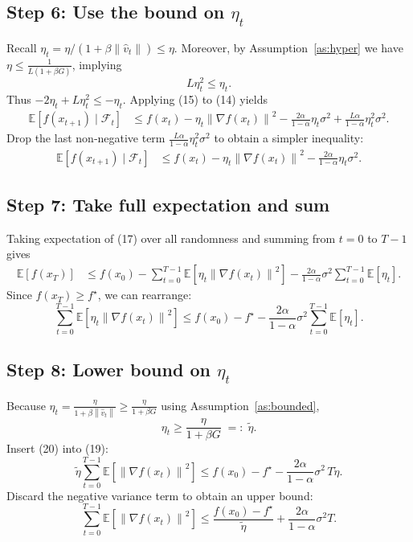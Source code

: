 \documentclass{article}
\newcommand{\E}{\mathbb{E}}
\newcommand{\norm}[1]{\left\|#1\right\|}
\newcommand{\grad}{\nabla}
\begin{document}
\subsection*{Step 6: Use the bound on $\eta_{t}$}
Recall $\eta_{t}= \eta/(1+\beta\norm{\hat v_{t}})\le \eta$. Moreover, by Assumption~\ref{as:hyper} we have $\eta\le \frac{1}{L(1+\beta G)}$, implying
\[
L\eta_{t}^{2}\le \eta_{t}. \tag{15}
\]
Thus $-2\eta_{t}+L\eta_{t}^{2}\le -\eta_{t}$. Applying (15) to (14) yields
\begin{align}
\E\!\left[f(x_{t+1})\mid\mathcal{F}_{t}\right]
&\le f(x_{t})
   -\eta_{t}\norm{\grad f(x_{t})}^{2}
   -\frac{2\alpha}{1-\alpha}\eta_{t}\sigma^{2}
   +\frac{L\alpha}{1-\alpha}\eta_{t}^{2}\sigma^{2}. \tag{16}
\end{align}
Drop the last non‑negative term $\frac{L\alpha}{1-\alpha}\eta_{t}^{2}\sigma^{2}$ to obtain a simpler inequality:
\begin{align}
\E\!\left[f(x_{t+1})\mid\mathcal{F}_{t}\right]
&\le f(x_{t}) -\eta_{t}\norm{\grad f(x_{t})}^{2}
   -\frac{2\alpha}{1-\alpha}\eta_{t}\sigma^{2}. \tag{17}
\end{align}

\subsection*{Step 7: Take full expectation and sum}
Taking expectation of (17) over all randomness and summing from $t=0$ to $T-1$ gives
\begin{align}
\E\!\left[f(x_{T})\right]
&\le f(x_{0})
   -\sum_{t=0}^{T-1}\E\!\left[\eta_{t}\norm{\grad f(x_{t})}^{2}\right]
   -\frac{2\alpha}{1-\alpha}\sigma^{2}\sum_{t=0}^{T-1}\E[\eta_{t}]. \tag{18}
\end{align}
Since $f(x_{T})\ge f^{\star}$, we can rearrange:
\[
\sum_{t=0}^{T-1}\E\!\left[\eta_{t}\norm{\grad f(x_{t})}^{2}\right]
\le f(x_{0})-f^{\star}
   -\frac{2\alpha}{1-\alpha}\sigma^{2}\sum_{t=0}^{T-1}\E[\eta_{t}]. \tag{19}
\]

\subsection*{Step 8: Lower bound on $\eta_{t}$}
Because $\eta_{t}= \displaystyle\frac{\eta}{1+\beta\norm{\hat v_{t}}}\ge \frac{\eta}{1+\beta G}$ using Assumption~\ref{as:bounded},
\[
\eta_{t}\ge \frac{\eta}{1+\beta G}\;=: \;\tilde\eta . \tag{20}
\]
Insert (20) into (19):
\[
\tilde\eta\sum_{t=0}^{T-1}\E\!\left[\norm{\grad f(x_{t})}^{2}\right]
\le f(x_{0})-f^{\star}
   -\frac{2\alpha}{1-\alpha}\sigma^{2}\,T\tilde\eta .
\]
Discard the negative variance term to obtain an upper bound:
\[
\sum_{t=0}^{T-1}\E\!\left[\norm{\grad f(x_{t})}^{2}\right]
\le \frac{f(x_{0})-f^{\star}}{\tilde\eta}
   +\frac{2\alpha}{1-\alpha}\sigma^{2}T . \tag{21}
\]
\end{document}
